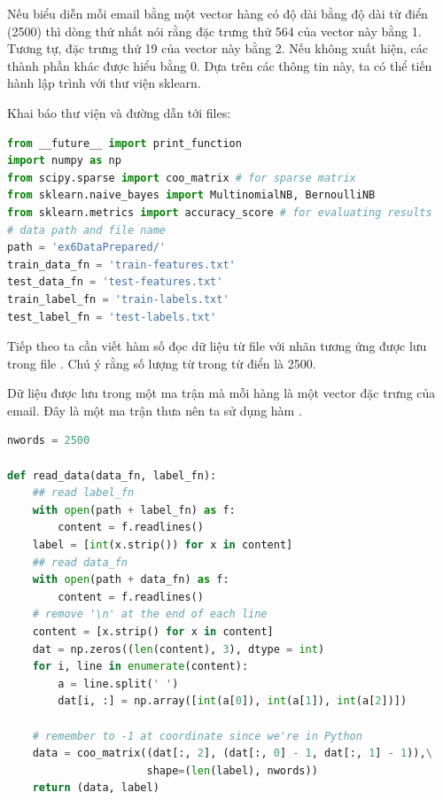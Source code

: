 Nếu biểu diễn mỗi email bằng một vector hàng có độ dài bằng độ dài từ điển
(2500) thì dòng thứ nhất nói rằng đặc trưng thứ 564 của vector này bằng 1. Tương
tự, đặc trưng thứ 19 của vector này bằng 2. Nếu không xuất hiện, các thành phần
khác được hiểu bằng 0. Dựa trên các thông tin này, ta có thể tiến hành
lập trình với thư viện sklearn.

{Khai báo thư viện và đường dẫn tới files:}

\begin{lstlisting}[language=Python]
from __future__ import print_function
import numpy as np
from scipy.sparse import coo_matrix # for sparse matrix
from sklearn.naive_bayes import MultinomialNB, BernoulliNB
from sklearn.metrics import accuracy_score # for evaluating results
# data path and file name
path = 'ex6DataPrepared/'
train_data_fn = 'train-features.txt'
test_data_fn = 'test-features.txt'
train_label_fn = 'train-labels.txt'
test_label_fn = 'test-labels.txt'
\end{lstlisting}

Tiếp theo ta cần viết hàm số đọc dữ liệu từ file  với nhãn tương ứng được lưu trong file . Chú ý rằng số lượng từ trong từ điển là 2500.

Dữ liệu được lưu trong một ma trận mà mỗi hàng là một vector đặc trưng của
email. Đây là một ma trận thưa nên ta sử dụng hàm
\href{https://docs.scipy.org/doc/scipy/reference/generated/scipy.sparse.coo_matrix.html}{}.

\begin{lstlisting}[language=Python]
nwords = 2500

def read_data(data_fn, label_fn):
    ## read label_fn
    with open(path + label_fn) as f:
        content = f.readlines()
    label = [int(x.strip()) for x in content]
    ## read data_fn
    with open(path + data_fn) as f:
        content = f.readlines()
    # remove '\n' at the end of each line
    content = [x.strip() for x in content]
    dat = np.zeros((len(content), 3), dtype = int)
    for i, line in enumerate(content):
        a = line.split(' ')
        dat[i, :] = np.array([int(a[0]), int(a[1]), int(a[2])])

    # remember to -1 at coordinate since we're in Python
    data = coo_matrix((dat[:, 2], (dat[:, 0] - 1, dat[:, 1] - 1)),\
                      shape=(len(label), nwords))
    return (data, label)
\end{lstlisting}


